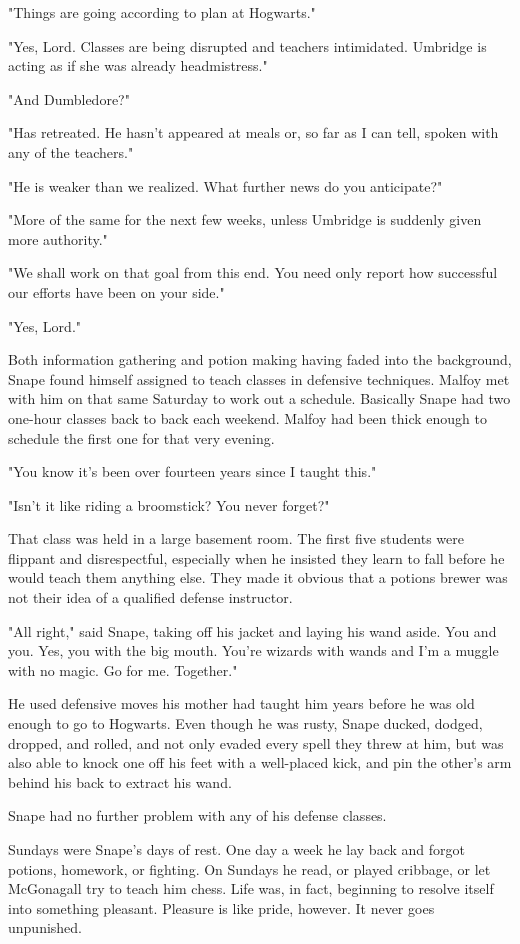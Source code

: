 \documentclass[a4paper,11pt]{article}
\begin{document}
"Things are going according to plan at Hogwarts."

"Yes, Lord. Classes are being disrupted and teachers intimidated. Umbridge is acting as if she was already headmistress."

"And Dumbledore?"

"Has retreated. He hasn't appeared at meals or, so far as I can tell, spoken with any of the teachers."

"He is weaker than we realized. What further news do you anticipate?"

"More of the same for the next few weeks, unless Umbridge is suddenly given more authority."

"We shall work on that goal from this end. You need only report how successful our efforts have been on your side."

"Yes, Lord."

Both information gathering and potion making having faded into the background, Snape found himself assigned to teach classes in defensive techniques. Malfoy met with him on that same Saturday to work out a schedule. Basically Snape had two one-hour classes back to back each weekend. Malfoy had been thick enough to schedule the first one for that very evening.

"You know it's been over fourteen years since I taught this."

"Isn't it like riding a broomstick? You never forget?"

That class was held in a large basement room. The first five students were flippant and disrespectful, especially when he insisted they learn to fall before he would teach them anything else. They made it obvious that a potions brewer was not their idea of a qualified defense instructor.

"All right," said Snape, taking off his jacket and laying his wand aside. You and you. Yes, you with the big mouth. You're wizards with wands and I'm a muggle with no magic. Go for me. Together."

He used defensive moves his mother had taught him years before he was old enough to go to Hogwarts. Even though he was rusty, Snape ducked, dodged, dropped, and rolled, and not only evaded every spell they threw at him, but was also able to knock one off his feet with a well-placed kick, and pin the other's arm behind his back to extract his wand.

Snape had no further problem with any of his defense classes.

Sundays were Snape's days of rest. One day a week he lay back and forgot potions, homework, or fighting. On Sundays he read, or played cribbage, or let McGonagall try to teach him chess. Life was, in fact, beginning to resolve itself into something pleasant. Pleasure is like pride, however. It never goes unpunished.
\end{document}
